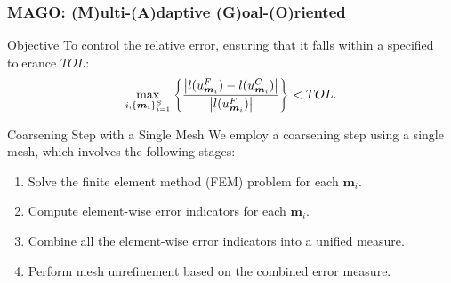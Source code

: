 \documentclass[10pt,aspectratio=149]{beamer}
\begin{document}
\begin{frame}
	\frametitle{MAGO: (M)ulti-(A)daptive (G)oal-(O)riented}
	
	\vspace{-1mm}	

\begin{block}{Objective}
	To control the relative error, ensuring that it falls within a specified tolerance $TOL$:
	\begin{equation}
		\max_{i, \{\boldsymbol{m}_i\}_{i=1}^S} \left\{ \frac{\left|l(u_{\boldsymbol{m}_i}^F)-l(u_{\boldsymbol{m}_i}^C)\right|}{\left|l(u_{\boldsymbol{m}_i}^F)\right|}\right\} < TOL.
	\end{equation}
\end{block}

\vspace{1mm}

\begin{block}{Coarsening Step with a Single Mesh}
	\vspace{2mm}
	We employ a coarsening step using a single mesh, which involves the following stages:
	\begin{enumerate}
		\item Solve the finite element method (FEM) problem for each $\boldsymbol{m}_i$.
		\item Compute element-wise error indicators for each $\boldsymbol{m}_i$.
		\item Combine all the element-wise error indicators into a unified measure.
		\item Perform mesh unrefinement based on the combined error measure.
	\end{enumerate}
\end{block}

\end{frame}
\end{document}
